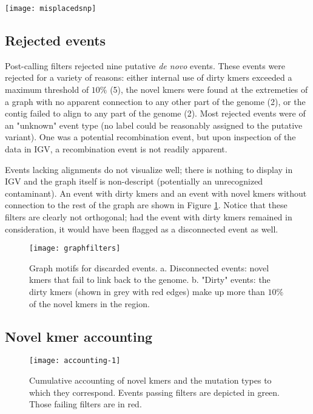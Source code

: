 \begin{sidewaysfigure}[h!]
  \centering
    \texttt{[image: misplacedsnp]}
  \caption{The true home of the aforementioned two SNPs.}
  \label{fig:misplacedsnp}
\end{sidewaysfigure}

\subsection{Rejected events}

Post-calling filters rejected nine putative \textit{de novo} events.  These events were rejected for a variety of reasons: either internal use of dirty kmers exceeded a maximum threshold of $10\%$ (5), the novel kmers were found at the extremeties of a graph with no apparent connection to any other part of the genome (2), or the contig failed to align to any part of the genome (2).  Most rejected events were of an "unknown" event type (no label could be reasonably assigned to the putative variant).  One was a potential recombination event, but upon inspection of the data in IGV, a recombination event is not readily apparent.

Events lacking alignments do not visualize well; there is nothing to display in IGV and the graph itself is non-descript (potentially an unrecognized contaminant).  An event with dirty kmers and an event with novel kmers without connection to the rest of the graph are shown in Figure \ref{fig:graphfilters}.  Notice that these filters are clearly not orthogonal; had the event with dirty kmers remained in consideration, it would have been flagged as a disconnected event as well.

\begin{figure}[h!]
  \centering
    \texttt{[image: graphfilters]}
  \caption{Graph motifs for discarded events.  a. Disconnected events: novel kmers that fail to link back to the genome.  b. "Dirty" events: the dirty kmers (shown in grey with red edges) make up more than $10\%$ of the novel kmers in the region.}
  \label{fig:graphfilters}
\end{figure}

\subsection{Novel kmer accounting}

\begin{figure}[h!]
  \centering
    \texttt{[image: accounting-1]}
  \caption{Cumulative accounting of novel kmers and the mutation types to which they correspond.  Events passing filters are depicted in green.  Those failing filters are in red.}
  \label{fig:accounting}
\end{figure}

